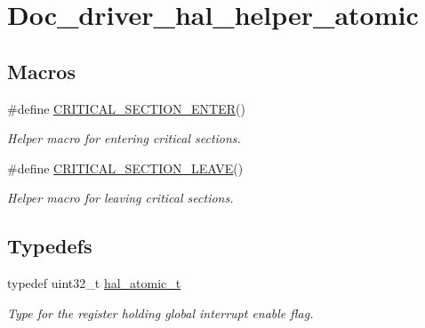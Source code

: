 \hypertarget{group__doc__driver__hal__helper__atomic}{}\section{Doc\+\_\+driver\+\_\+hal\+\_\+helper\+\_\+atomic}
\label{group__doc__driver__hal__helper__atomic}
\subsection*{Macros}
\begin{DoxyCompactItemize}
\item 
\#define \hyperlink{group__doc__driver__hal__helper__atomic_ga039bfe712b6ba4388a35672f54763391}{C\+R\+I\+T\+I\+C\+A\+L\+\_\+\+S\+E\+C\+T\+I\+O\+N\+\_\+\+E\+N\+T\+ER}()
\begin{DoxyCompactList}\small\item\em Helper macro for entering critical sections. \end{DoxyCompactList}\item 
\#define \hyperlink{group__doc__driver__hal__helper__atomic_ga6b32c9f95e7c6b604d621e215c514015}{C\+R\+I\+T\+I\+C\+A\+L\+\_\+\+S\+E\+C\+T\+I\+O\+N\+\_\+\+L\+E\+A\+VE}()
\begin{DoxyCompactList}\small\item\em Helper macro for leaving critical sections. \end{DoxyCompactList}\end{DoxyCompactItemize}
\subsection*{Typedefs}
\begin{DoxyCompactItemize}
\item 
\mbox{\label{group__doc__driver__hal__helper__atomic_ga6b3a0c9eea25111ac1877e0302e2fe1c}} 
typedef uint32\+\_\+t \hyperlink{group__doc__driver__hal__helper__atomic_ga6b3a0c9eea25111ac1877e0302e2fe1c}{hal\+\_\+atomic\+\_\+t}
\begin{DoxyCompactList}\small\item\em Type for the register holding global interrupt enable flag. \end{DoxyCompactList}\end{DoxyCompactItemize}
